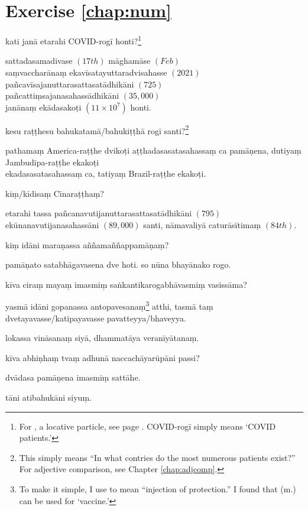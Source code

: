 \section*{Exercise \ref{chap:num}}
\begin{answerkey}
\item kati jan\=a etarahi COVID-rog\=i honti?\footnote{For , a locative particle, see page \pageref{nip:intime}. COVID-rog\=i simply means `COVID patients.'}
\item sattadasamadivase $(17th)$ m\=agham\=ase $(Feb)$ \\sa\d mvacchar\=ana\d m ekav\=isatayuttaradvisahasse $(2021)$ \\pa\~ncav\=isajanuttarasattasat\=adhik\=ani $(725)$ \\pa\~ncatti\d msajanasahass\=adhik\=ani $(35,000)$ \\jan\=ana\d m ek\=adasako\d ti $(11 \times 10^{7})$ honti.
\item kesu ra\d t\d thesu bahukatam\=a/bahuki\d t\d th\=a rog\=i santi?\footnote{This simply means ``In what contries do the most numerous patients exist?'' For adjective comparison, see Chapter \ref{chap:adjcomp}.}
\item pathama\d m America-ra\d t\d the dviko\d ti a\d t\d thadasasatasahassa\d m ca pam\=a\d nena, dutiya\d m Jambud\=ipa-ra\d t\d the ekako\d ti \\ekadasasatasahassa\d m ca, tatiya\d m Brazil-ra\d t\d the ekako\d ti.
\item ki\d m/k\=idisa\d m C\=inara\d t\d tha\d m?
\item etarahi tassa pa\~ncanavutijanuttarasattasat\=adhik\=ani $(795)$ \\ek\=unanavutijanasahass\=ani $(89,000)$ santi, n\=amavaliy\=a catur\=as\=itima\d m $(84th)$.
\item ki\d m id\=ani mara\d nassa a\~n\~nama\~n\~nappam\=a\d na\d m?
\item pam\=a\d nato satabh\=agavasena dve hoti. so n\=una bhay\=anako rogo.
\item k\=iva cira\d m maya\d m imasmi\d m sa\.nkantikarogabh\=avasmi\d m vasiss\=ama?
\item yasm\=a id\=ani gopanassa antopavesana\d m\footnote{To make it simple, I use  to mean ``injection of protection.'' I found that  (m.) can be used for `vaccine.'} atthi, tasm\=a ta\d m dvetayavasse/katipayavasse pavatteyya/bhaveyya.
\item lokassa vin\=asana\d m siy\=a, dhammat\=aya veran\=iy\=atana\d m.
\item k\=iva abhi\d nha\d m tva\d m adhun\=a naccach\=ayar\=up\=ani passi?
\item dv\=adasa pam\=a\d nena imasmi\d m satt\=ahe.
\item t\=ani atibahuk\=ani siyu\d m.
\end{answerkey}

